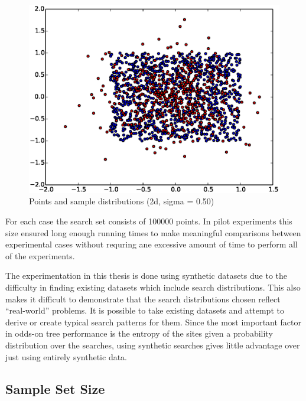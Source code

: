 \documentclass[mcs]{scsthesis}
\begin{document}
\begin{figure}
\begin{center}
\includegraphics[scale=0.5]{diagrams/pts_plot_sigma0.50.eps}
\caption{Points and sample distributions (2d, sigma = 0.50)}
\label{fig:points_and_sample_2d_0_50}
\end{center}
\end{figure}

For each case the search set consists of 100000 points. In pilot experiments
this size ensured long enough running times to make meaningful comparisons
between experimental cases without requring ane excessive amount of time to
perform all of the experiments.

The experimentation in this thesis is done using synthetic datasets due to the
difficulty in finding existing datasets which include search distributions. This
also makes it difficult to demonstrate that the search distributions chosen
reflect ``real-world'' problems. It is possible to take existing datasets and
attempt to derive or create typical search patterns for them. Since the
most important factor in odds-on tree performance is the entropy of the sites
given a probability distribution over the searches, using synthetic searches
gives little advantage over just using entirely synthetic data.


\subsection{Sample Set Size}
\end{document}
